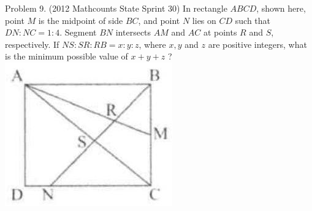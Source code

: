 \documentclass[10pt]{article}
\begin{document}
Problem 9. (2012 Mathcounts State Sprint 30) In rectangle \(A B C D\), shown here, point \(M\) is the midpoint of side \(B C\), and point \(N\) lies on \(C D\) such that \(D N: N C=1: 4\). Segment \(B N\) intersects \(A M\) and \(A C\) at points \(R\) and \(S\), respectively. If \(N S: S R: R B=x: y: z\), where \(x, y\) and \(z\) are positive integers, what is the minimum possible value of \(x+y+z\) ?\\
\includegraphics[max width=\textwidth, center]{2025_04_17_97bc1f7e44d93c271a88g-127(2)}
\end{document}
